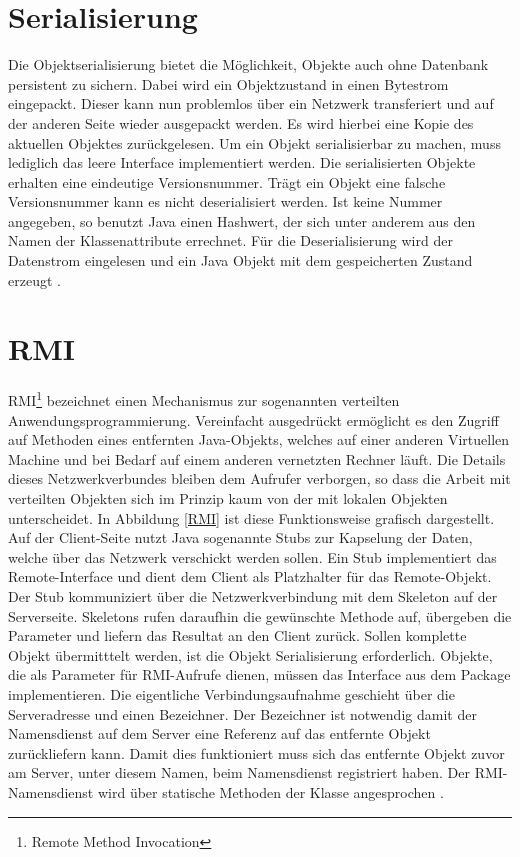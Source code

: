 \section{Serialisierung}
Die Objektserialisierung bietet die M\"oglichkeit, Objekte auch ohne Datenbank persistent zu sichern. Dabei wird ein Objektzustand in einen Bytestrom eingepackt. Dieser kann nun problemlos \"uber ein Netzwerk transferiert und auf der anderen Seite wieder ausgepackt werden. Es wird hierbei eine Kopie des aktuellen Objektes zur\"uckgelesen. Um ein Objekt serialisierbar zu machen, muss lediglich das leere Interface  implementiert werden. Die serialisierten Objekte erhalten eine eindeutige Versionsnummer. Tr\"agt ein Objekt eine falsche Versionsnummer kann es nicht deserialisiert werden. Ist keine Nummer angegeben, so benutzt Java einen Hashwert, der sich unter anderem aus den Namen der Klassenattribute errechnet. F\"ur die Deserialisierung wird der Datenstrom eingelesen und ein Java Objekt mit dem gespeicherten Zustand erzeugt \cite{Lange}.

\section{RMI}
RMI\footnote{Remote Method Invocation} bezeichnet einen Mechanismus zur sogenannten verteilten Anwendungsprogrammierung. Vereinfacht ausgedr\"uckt erm\"oglicht es den Zugriff auf Methoden eines entfernten Java-Objekts, welches auf einer anderen Virtuellen Machine und bei Bedarf auf einem anderen vernetzten Rechner l\"auft. Die Details dieses Netzwerkverbundes bleiben dem Aufrufer verborgen, so dass die Arbeit mit verteilten Objekten sich im Prinzip kaum von der mit lokalen Objekten unterscheidet. In Abbildung \ref{RMI} ist diese Funktionsweise grafisch dargestellt.
Auf der Client-Seite nutzt Java sogenannte Stubs zur Kapselung der Daten, welche \"uber das Netzwerk verschickt werden sollen. Ein Stub implementiert das Remote-Interface und dient dem Client als Platzhalter f\"ur das Remote-Objekt. Der Stub kommuniziert \"uber die Netzwerkverbindung mit dem Skeleton auf der Serverseite. Skeletons rufen daraufhin die gew\"unschte Methode auf, \"ubergeben die Parameter und liefern das Resultat an den Client zur\"uck. Sollen komplette Objekt \"ubermitttelt werden, ist die Objekt Serialisierung erforderlich. Objekte, die als Parameter f\"ur RMI-Aufrufe dienen, m\"ussen das Interface  aus dem Package  implementieren.
Die eigentliche Verbindungsaufnahme geschieht \"uber die Serveradresse und einen Bezeichner. Der Bezeichner ist notwendig damit der Namensdienst auf dem Server eine Referenz auf das entfernte Objekt zur\"uckliefern kann. Damit dies funktioniert muss sich das entfernte Objekt zuvor am Server, unter diesem Namen, beim Namensdienst registriert haben. Der RMI-Namensdienst wird \"uber statische Methoden der Klasse  angesprochen \cite{SBoegel}.


